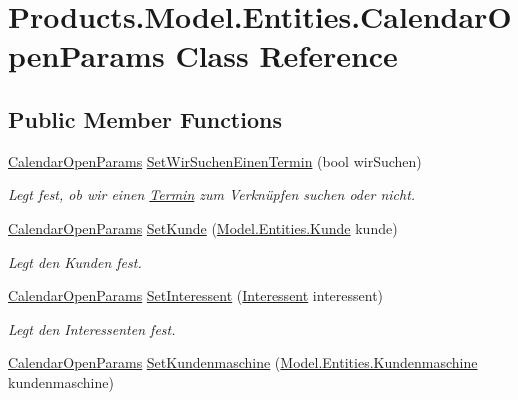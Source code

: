 \hypertarget{class_products_1_1_model_1_1_entities_1_1_calendar_open_params}{}\section{Products.\+Model.\+Entities.\+Calendar\+Open\+Params Class Reference}
\label{class_products_1_1_model_1_1_entities_1_1_calendar_open_params}
\subsection*{Public Member Functions}
\begin{DoxyCompactItemize}
\item 
\hyperlink{class_products_1_1_model_1_1_entities_1_1_calendar_open_params}{Calendar\+Open\+Params} \hyperlink{class_products_1_1_model_1_1_entities_1_1_calendar_open_params_ade8977a424f421d2f67592e3d76f591c}{Set\+Wir\+Suchen\+Einen\+Termin} (bool wir\+Suchen)
\begin{DoxyCompactList}\small\item\em Legt fest, ob wir einen \hyperlink{class_products_1_1_model_1_1_entities_1_1_termin}{Termin} zum Verknüpfen suchen oder nicht. \end{DoxyCompactList}\item 
\hyperlink{class_products_1_1_model_1_1_entities_1_1_calendar_open_params}{Calendar\+Open\+Params} \hyperlink{class_products_1_1_model_1_1_entities_1_1_calendar_open_params_aa1cf7e661ed863c76ce8b5d0e18a295d}{Set\+Kunde} (\hyperlink{class_products_1_1_model_1_1_entities_1_1_kunde}{Model.\+Entities.\+Kunde} kunde)
\begin{DoxyCompactList}\small\item\em Legt den Kunden fest. \end{DoxyCompactList}\item 
\hyperlink{class_products_1_1_model_1_1_entities_1_1_calendar_open_params}{Calendar\+Open\+Params} \hyperlink{class_products_1_1_model_1_1_entities_1_1_calendar_open_params_a7a24fb71a52254865992941e2b8020f5}{Set\+Interessent} (\hyperlink{class_products_1_1_model_1_1_entities_1_1_interessent}{Interessent} interessent)
\begin{DoxyCompactList}\small\item\em Legt den Interessenten fest. \end{DoxyCompactList}\item 
\hyperlink{class_products_1_1_model_1_1_entities_1_1_calendar_open_params}{Calendar\+Open\+Params} \hyperlink{class_products_1_1_model_1_1_entities_1_1_calendar_open_params_ac18acada6c622ae19965eb97db6d0cad}{Set\+Kundenmaschine} (\hyperlink{class_products_1_1_model_1_1_entities_1_1_kundenmaschine}{Model.\+Entities.\+Kundenmaschine} kundenmaschine)

\end{DoxyCompactItemize}
